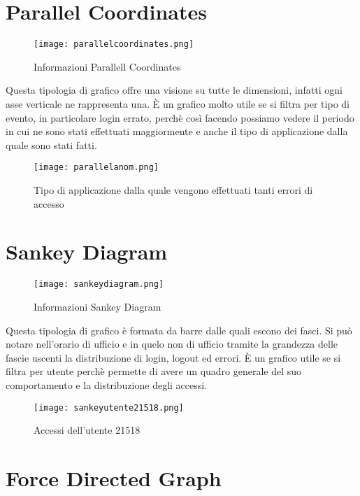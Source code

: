 \section{Parallel Coordinates}
\begin{figure}[ht]
	\centering
	\texttt{[image: parallelcoordinates.png]}
	\caption{Informazioni Parallell Coordinates}
  \end{figure}
Questa tipologia di grafico offre una visione su tutte le dimensioni, infatti ogni asse verticale ne rappresenta una. È un grafico molto utile se si filtra per tipo di evento, in particolare login errato, perchè così facendo possiamo vedere il periodo in cui ne sono stati effettuati maggiormente e anche il tipo di applicazione dalla quale sono stati fatti.
\begin{figure}[ht]
	\centering
	\texttt{[image: parallelanom.png]}
	\caption{Tipo di applicazione dalla quale vengono effettuati tanti errori di accesso}
  \end{figure}
\section{Sankey Diagram}
\begin{figure}[ht]
	\centering
	\texttt{[image: sankeydiagram.png]}
	\caption{Informazioni Sankey Diagram}
  \end{figure}
Questa tipologia di grafico è formata da barre dalle quali escono dei fasci. Si può notare nell'orario di ufficio e in quelo non di ufficio tramite la grandezza delle fascie uscenti la distribuzione di login, logout ed errori. È un grafico utile se si filtra per utente perchè permette di avere un quadro generale del suo comportamento e la distribuzione degli accessi.
\begin{figure}[ht]
	\centering
	\texttt{[image: sankeyutente21518.png]}
	\caption{Accessi dell'utente 21518}
  \end{figure}
\section{Force Directed Graph}
